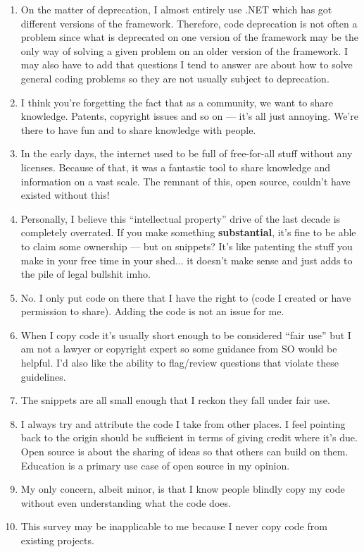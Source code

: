 \documentclass{svjour3}                     %
\begin{document}
\begin{enumerate}
	\item On the matter of deprecation, I almost entirely use .NET which has got different versions of the framework. Therefore, code deprecation is not often a problem since what is deprecated on one version of the framework may be the only way of solving a given problem on an older version of the framework. I may also have to add that questions I tend to answer are about how to solve general coding problems so they are not usually subject to deprecation.
	\item I think you're forgetting the fact that as a community, we want to share knowledge. Patents, copyright issues and so on --- it's all just annoying. We're there to have fun and to share knowledge with people. 
	\item In the early days, the internet used to be full of free-for-all stuff without any licenses. Because of that, it was a fantastic tool to share knowledge and information on a vast scale. The remnant of this, open source, couldn't have existed without this!
	\item Personally, I believe this ``intellectual property'' drive of the last decade is completely overrated. If you make something \textbf{substantial}, it's fine to be able to claim some ownership --- but on snippets? It's like patenting the stuff you make in your free time in your shed... it doesn't make sense and just adds to the pile of legal bullshit imho.
	\item No. I only put code on there that I have the right to (code I created or have permission to share). Adding the code is not an issue for me.
	\item When I copy code it's usually short enough to be considered ``fair use'' but I am not a lawyer or copyright expert so some guidance from SO would be helpful. I'd also like the ability to flag/review questions that violate these guidelines.
	\item The snippets are all small enough that I reckon they fall under fair use.
	\item I always try and attribute the code I take from other places. I feel pointing back to the origin should be sufficient in terms of giving credit where it's due. Open source is about the sharing of ideas so that others can build on them. Education is a primary use case of open source in my opinion.
	\item My only concern, albeit minor, is that I know people blindly copy my code without even understanding what the code does.
	\item This survey may be inapplicable to me because I never copy code from existing projects.

\end{enumerate}
\end{document}
